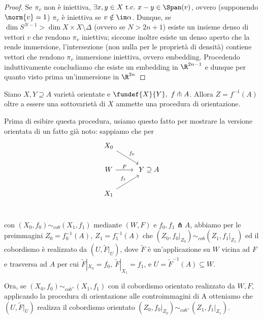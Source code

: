 \begin{proof}
Se $\pi_v$ non è iniettiva, $\exists x,y \in X \tc x-y \in \Span(v)$, ovvero (supponendo \wlg $\norm{v} = 1$) $\pi_v$ è iniettiva se $v \notin \im \alpha$. Dunque, se $\dim S^{N-1} > \dim X \times X \setminus \Delta$ (ovvero se $N > 2n+1$) esiste un insieme denso di vettori $v$ che rendono $\pi_v$ iniettiva; siccome inoltre esiste un denso aperto che la rende immersione, l'intersezione (non nulla per le proprietà di densità) contiene vettori che rendono $\pi_v$ immersione iniettiva, ovvero embedding. Procedendo induttivamente concludiamo che esiste un embedding in $\R^{2n-1}$ e dunque per quanto visto prima un'immersione in $\R^{2n}$
\end{proof}


\begin{prop}
Siano $X, Y \supseteq A$ varietà orientate e $\fundef{X}{Y}, \ f \pitchfork A$.
Allora $Z = f^{-1}(A)$ oltre a essere una sottovarietà di $X$ ammette una procedura di orientazione.
\end{prop}

Prima di esibire questa procedura, usiamo questo fatto per mostrare la versione orientata di un fatto già noto: sappiamo che per \[
\begin{tikzcd}
X_0 \arrow[dr, "f_0"] & \\
W \arrow[r, "F"] & \ Y \supseteq A \\
X_1 \arrow[ur, "f_1"] & \\
\end{tikzcd} \]

con $(X_0, f_0) \sim_{cob} (X_1, f_1)$ mediante $(W,F)$ e $f_0, f_1 \pitchfork A$, abbiamo per le preimmagini $Z_0 = f_0^{-1}(A), \ Z_1 = f_1^{-1}(A)$ che $(Z_0, f_0 |_{Z_0}) \sim_{cob} (Z_1, f_1 |_{Z_1})$ ed il cobordismo è realizzato da $(U, \tilde{F}|_U)$, dove $\tilde{F}$ è un'applicazione su $W$ vicina ad $F$ e trasversa ad $A$ per cui $\tilde{F}|_{X_0} = f_0, \ \tilde{F}|_{X_1} = f_1$, e $U = \tilde{F}^{-1}(A) \subseteq W$.

Ora, se $(X_0, f_0) \sim_{cob^+} (X_1, f_1)$ con il cobordismo orientato realizzato da $W, F$, applicando la procedura di orientazione alle controimmagini di A otteniamo che $(U, \tilde{F}|_U)$ realizza il cobordismo orientato $(Z_0, f_0 |_{Z_0}) \sim_{cob^+} (Z_1, f_1 |_{Z_1})$.

